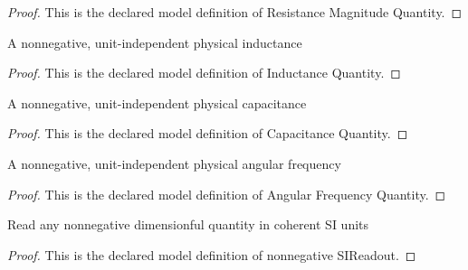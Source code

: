 \begin{proof}
  This is the declared model definition of Resistance Magnitude Quantity.
\end{proof}
\begin{definition}
  \label{def:physics:phyx-mini-0943:phyxminiproblems-problemphyxmini0943-inductancequantity}
  A nonnegative, unit-independent physical inductance
\end{definition}
\begin{proof}
  This is the declared model definition of Inductance Quantity.
\end{proof}
\begin{definition}
  \label{def:physics:phyx-mini-0943:phyxminiproblems-problemphyxmini0943-capacitancequantity}
  A nonnegative, unit-independent physical capacitance
\end{definition}
\begin{proof}
  This is the declared model definition of Capacitance Quantity.
\end{proof}
\begin{definition}
  \label{def:physics:phyx-mini-0943:phyxminiproblems-problemphyxmini0943-angularfrequencyquantity}
  A nonnegative, unit-independent physical angular frequency
\end{definition}
\begin{proof}
  This is the declared model definition of Angular Frequency Quantity.
\end{proof}
\begin{definition}
  \label{def:physics:phyx-mini-0943:phyxminiproblems-problemphyxmini0943-nonnegativesireadout}
  Read any nonnegative dimensionful quantity in coherent SI units
\end{definition}
\begin{proof}
  This is the declared model definition of nonnegative SIReadout.
\end{proof}
